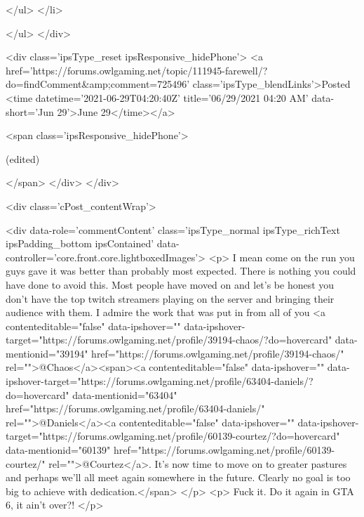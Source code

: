                         
						
						
						
							
								
							
							
							
							
							
							
						
					</ul>
				</li>
				
			</ul>
		</div>

		<div class='ipsType_reset ipsResponsive_hidePhone'>
			<a href='https://forums.owlgaming.net/topic/111945-farewell/?do=findComment&amp;comment=725496' class='ipsType_blendLinks'>Posted <time datetime='2021-06-29T04:20:40Z' title='06/29/2021 04:20  AM' data-short='Jun 29'>June 29</time></a> 
			
			<span class='ipsResponsive_hidePhone'>
				
					(edited)
				
				
			</span>
		</div>
	</div>

	

    

	<div class='cPost_contentWrap'>
		
		<div data-role='commentContent' class='ipsType_normal ipsType_richText ipsPadding_bottom ipsContained' data-controller='core.front.core.lightboxedImages'>
			<p>
	I mean come on the run you guys gave it was better than probably most expected. There is nothing you could have done to avoid this. Most people have moved on and let's be honest you don't have the top twitch streamers playing on the server and bringing their audience with them. I admire the work that was put in from all of you <a contenteditable="false" data-ipshover="" data-ipshover-target="https://forums.owlgaming.net/profile/39194-chaos/?do=hovercard" data-mentionid="39194" href="https://forums.owlgaming.net/profile/39194-chaos/" rel="">@Chaos</a><span><a contenteditable="false" data-ipshover="" data-ipshover-target="https://forums.owlgaming.net/profile/63404-daniels/?do=hovercard" data-mentionid="63404" href="https://forums.owlgaming.net/profile/63404-daniels/" rel="">@Daniels</a><a contenteditable="false" data-ipshover="" data-ipshover-target="https://forums.owlgaming.net/profile/60139-courtez/?do=hovercard" data-mentionid="60139" href="https://forums.owlgaming.net/profile/60139-courtez/" rel="">@Courtez</a>. It's now time to move on to greater pastures and perhaps we'll all meet again somewhere in the future. Clearly no goal is too big to achieve with dedication.</span>
</p>
<p>
	Fuck it. Do it again in GTA 6, it ain't over?!
</p>


